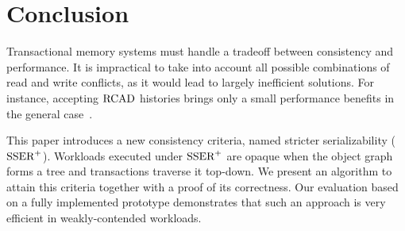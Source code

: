 \section{Conclusion}

Transactional memory systems must handle a tradeoff between consistency and performance.
It is impractical to take into account all possible combinations of read and write conflicts, as it would lead to largely inefficient solutions.
For instance, accepting $\RCAD$ histories brings only a small performance benefits in the general case~\cite{hans16}.

This paper introduces a new consistency criteria, named stricter serializability ($\SPSER$).
Workloads executed under $\SPSER$ are opaque when the object graph forms a tree and transactions traverse it top-down.
We present an algorithm to attain this criteria together with a proof of its correctness.
Our evaluation based on a fully implemented prototype demonstrates that such an approach is very efficient in weakly-contended workloads.
